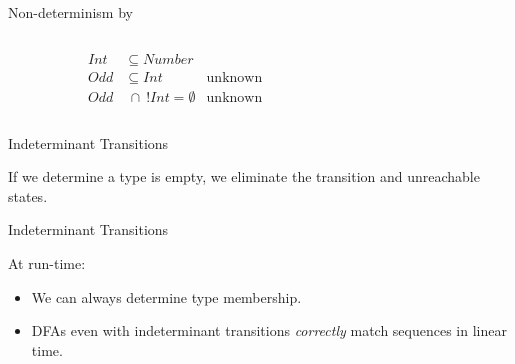 \begin{frame}{Non-determinism by }
  \begin{columns}
    \begin{column}{0.35\textwidth}
      \centering
      
      \begin{align*}
        Int&\subseteq Number\\
        Odd&\subseteq Int &\text{unknown}\\
        Odd&~\cap~ !Int = \emptyset &\text{unknown}
      \end{align*}
      \scalebox{0.8}{}
    \end{column}%
    \begin{column}{0.7\textwidth}
      \only<1>{\scalebox{0.6}{}}%
    \end{column}
  \end{columns}

\end{frame}








\newsavebox\classbox
\begin{lrbox}{\classbox}
  \begin{minipage}{5cm}
    
  \end{minipage}
\end{lrbox}

\begin{frame}{Indeterminant Transitions}

  \scalebox{0.8}{}

  If we determine a type is empty, we eliminate the
  transition and unreachable states.
\end{frame}


\begin{frame}{Indeterminant Transitions}

  \scalebox{0.8}{}
  At run-time:
  \begin{itemize}

    \item We can always determine type membership.

    \item DFAs even with indeterminant transitions \emph{correctly} match sequences in linear time.  
  \end{itemize}
\end{frame}


